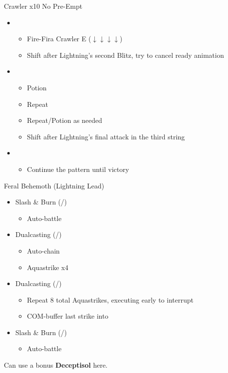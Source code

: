 \begin{multicols}{2}
\begin{battle}{Crawler x10 No Pre-Empt}
\begin{itemize}
    \item \first
    \begin{itemize}
        \item Fire-Fira Crawler E ($\downarrow \downarrow \downarrow \downarrow$)
        \item Shift after Lightning's second Blitz, try to cancel ready animation
    \end{itemize}
    \item \sixth
    \begin{itemize}
        \item Potion
        \item Repeat
        \item Repeat/Potion as needed
        \item Shift after Lightning's final attack in the third string
    \end{itemize}
    \item \first
    \begin{itemize}
        \item Continue the pattern until victory
    \end{itemize}
\end{itemize}
\end{battle}
\renewcommand{\first}{[1] Slash \& Burn (\com/\rav)}
\renewcommand{\second}{[2] War \& Peace (\com/\med)}
\renewcommand{\third}{[3] Supersoldier (\com/\syn)}
\renewcommand{\fourth}{[4] Dualcasting (\rav/\rav)}
\renewcommand{\fifth}{[5] Dualcasting (\rav/\rav)}
\renewcommand{\sixth}{[6] Slash \& Burn (\com/\rav)}
\begin{battle}{Feral Behemoth (Lightning Lead)}
\begin{itemize}
    \item \first
    \begin{itemize}
        \item Auto-battle
    \end{itemize}
    \item \fourth
    \begin{itemize}
        \item Auto-chain
        \item Aquastrike x4
    \end{itemize}
    \item \fifth
    \begin{itemize}
        \item Repeat 8 total Aquastrikes, executing early to interrupt
        \item COM-buffer last strike into
    \end{itemize}
    \item \sixth
    \begin{itemize}
        \item Auto-battle
    \end{itemize}
\end{itemize}
\end{battle}

  Can use a bonus \textbf{Deceptisol} here.
\vfill
\end{multicols}
